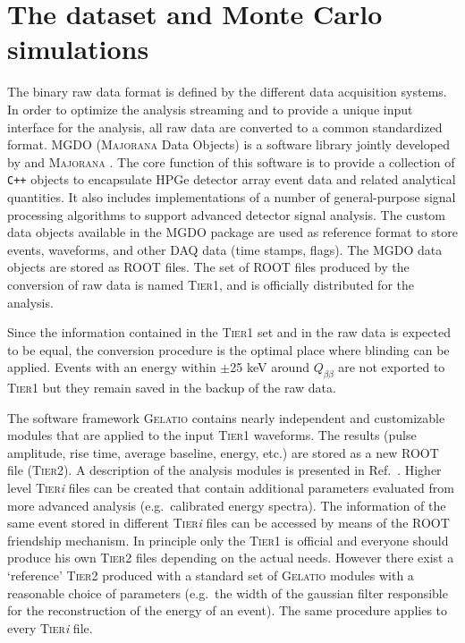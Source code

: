 \chapter{The {\gerda} dataset and Monte Carlo simulations}
 The binary raw data format is defined by the different data acquisition systems. In order to optimize the analysis streaming and to provide a unique input interface for the analysis, all raw data are converted to a common standardized format. MGDO \cite{MGDO} (\textsc{Majorana} {\gerda} Data Objects) is a software library jointly developed by {\gerda} and \textsc{Majorana} \cite{majoranadem}. The core function of this software is to provide a collection of \texttt{C++} objects to encapsulate HPGe detector array event data and related analytical quantities. It also includes implementations of a number of general-purpose signal processing algorithms to support advanced detector signal analysis. The custom data objects available in the MGDO package are used as reference format to store events, waveforms, and other DAQ data (time stamps, flags). The MGDO data objects are stored as ROOT \cite{ROOT} files. The set of ROOT files produced by the conversion of raw data is named \textsc{Tier1}, and is officially distributed for the analysis.

Since the information contained in the \textsc{Tier1} set and in the raw data is expected to be equal, the conversion procedure is the optimal place where blinding can be applied. Events with an energy within $\pm$25 keV around $Q_{\beta\beta}$ are not exported to \textsc{Tier1} but they remain saved in the backup of the raw data.

The software framework \textsc{Gelatio} \cite{GELATIO} contains nearly independent and customizable modules that are applied to the input \textsc{Tier1} waveforms. The results (pulse amplitude, rise time, average baseline, energy, etc.) are stored as a new ROOT file (\textsc{Tier2}). A description of the analysis modules is presented in Ref.~\cite{dataproc}. Higher level \textsc{Tier}\emph{i} files can be created that contain additional parameters evaluated from more advanced analysis (e.g.~calibrated energy spectra). The information of the same event stored in different \textsc{Tier}\emph{i} files can be accessed by means of the ROOT friendship mechanism. In principle only the \textsc{Tier1} is official and everyone should produce his own \textsc{Tier2} files depending on the actual needs. However there exist a `reference' \textsc{Tier2} produced with a standard set of \textsc{Gelatio} modules with a reasonable choice of parameters (e.g.~the width of the gaussian filter responsible for the reconstruction of the energy of an event). The same procedure applies to every \textsc{Tier}\emph{i} file.

